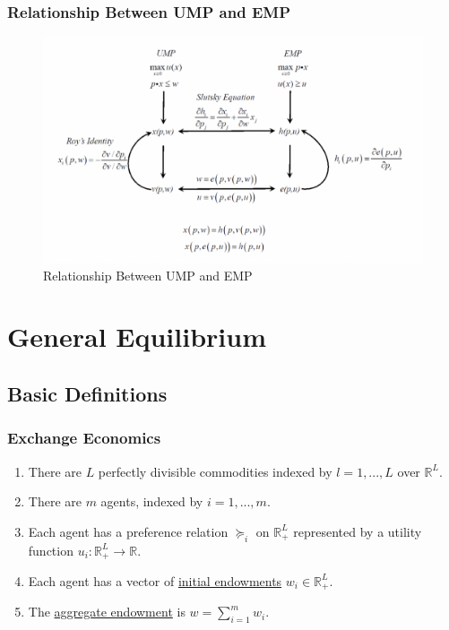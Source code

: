 \documentclass[11pt]{elegantbook}
\begin{document}
\subsection{Relationship Between UMP and EMP}
\begin{figure}[htbp]
    \centering
    \includegraphics[scale=0.6]{UMP-EMP.png}
    \caption{Relationship Between UMP and EMP}
    \label{}
\end{figure}





















\chapter{General Equilibrium}
\section{Basic Definitions}
\subsection{Exchange Economics}
\begin{enumerate}
    \item There are $L$ perfectly divisible commodities indexed by $l=1,...,L$ over $\mathbb{R}^L$.
    \item There are $m$ agents, indexed by $i=1,...,m$.
    \item Each agent has a preference relation $\succeq_i$ on $\mathbb{R}_+^L$ represented by a utility function $u_i: \mathbb{R}_+^L \rightarrow \mathbb{R}$.
    \item Each agent has a vector of \underline{initial endowments} $w_i\in \mathbb{R}_+^L$.
    \item The \underline{aggregate endowment} is $w=\sum_{i=1}^m w_i$.
\end{enumerate}
\end{document}
